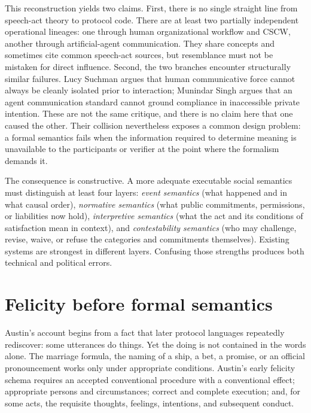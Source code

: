 \documentclass[11pt]{article}
\begin{document}
This reconstruction yields two claims. First, there is no single straight line from speech-act theory to protocol code. There are at least two partially independent operational lineages: one through human organizational workflow and CSCW, another through artificial-agent communication. They share concepts and sometimes cite common speech-act sources, but resemblance must not be mistaken for direct influence. Second, the two branches encounter structurally similar failures. Lucy Suchman argues that human communicative force cannot always be cleanly isolated prior to interaction; Munindar Singh argues that an agent communication standard cannot ground compliance in inaccessible private intention. These are not the same critique, and there is no claim here that one caused the other. Their collision nevertheless exposes a common design problem: a formal semantics fails when the information required to determine meaning is unavailable to the participants or verifier at the point where the formalism demands it. \cite{suchman1993categories,singh1998rethinking}

The consequence is constructive. A more adequate executable social semantics must distinguish at least four layers: \emph{event semantics} (what happened and in what causal order), \emph{normative semantics} (what public commitments, permissions, or liabilities now hold), \emph{interpretive semantics} (what the act and its conditions of satisfaction mean in context), and \emph{contestability semantics} (who may challenge, revise, waive, or refuse the categories and commitments themselves). Existing systems are strongest in different layers. Confusing those strengths produces both technical and political errors.

\section{Felicity before formal semantics}
Austin's account begins from a fact that later protocol languages repeatedly rediscover: some utterances do things. Yet the doing is not contained in the words alone. The marriage formula, the naming of a ship, a bet, a promise, or an official pronouncement works only under appropriate conditions. Austin's early felicity schema requires an accepted conventional procedure with a conventional effect; appropriate persons and circumstances; correct and complete execution; and, for some acts, the requisite thoughts, feelings, intentions, and subsequent conduct. \cite{austin1962things}
\end{document}

